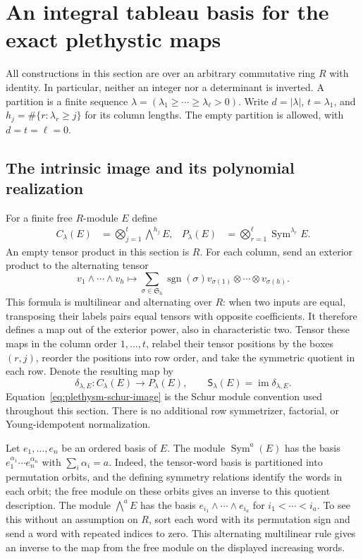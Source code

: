 \section{An integral tableau basis for the exact plethystic maps}
\label{sec:plethysm-integral-tableau-basis}

All constructions in this section are over an arbitrary commutative ring
$R$ with identity. In particular, neither an integer nor a determinant
is inverted. A partition is a finite sequence
$\lambda=(\lambda_1\geq\cdots\geq\lambda_\ell>0)$.
Write $d=|\lambda|$, $t=\lambda_1$, and
$h_j=\#\{r:\lambda_r\geq j\}$ for its column lengths.
The empty partition is allowed, with $d=t=\ell=0$.

\subsection{The intrinsic image and its polynomial realization}

For a finite free $R$-module $E$ define
\begin{align}
 C_\lambda(E)&=\bigotimes_{j=1}^{t}\bigwedge^{h_j}E,
 &P_\lambda(E)&=\bigotimes_{r=1}^{\ell}\operatorname{Sym}^{\lambda_r}E.
 \label{eq:plethysm-column-row-modules}
\end{align}
An empty tensor product in this section is $R$.
For each column, send an exterior product to the alternating tensor
\[
 v_1\wedge\cdots\wedge v_h\longmapsto
 \sum_{\sigma\in\mathfrak S_h}\operatorname{sgn}(\sigma)
 v_{\sigma(1)}\otimes\cdots\otimes v_{\sigma(h)}.
\]
This formula is multilinear and alternating over $R$: when two inputs
are equal, transposing their labels pairs equal tensors with opposite
coefficients. It therefore defines a map out of the exterior power,
also in characteristic two. Tensor these maps in the column order
$1,\ldots,t$, relabel their tensor positions by the boxes $(r,j)$,
reorder the positions into row order, and take the symmetric quotient
in each row. Denote the resulting map by
\begin{equation}
 \delta_{\lambda,E}:C_\lambda(E)\longrightarrow P_\lambda(E),
 \qquad
 \mathsf S_\lambda(E)=\operatorname{im}\delta_{\lambda,E}.
 \label{eq:plethysm-schur-image}
\end{equation}
Equation~\eqref{eq:plethysm-schur-image} is the Schur module convention
used throughout this section. There is no additional row
symmetrizer, factorial, or Young-idempotent normalization.

Let $e_1,\ldots,e_n$ be an ordered basis of $E$.
The module $\operatorname{Sym}^a(E)$ has the basis
$e_1^{\alpha_1}\cdots e_n^{\alpha_n}$ with
$\sum_i\alpha_i=a$. Indeed, the tensor-word basis is partitioned into
permutation orbits, and the defining symmetry relations identify the
words in each orbit; the free module on these orbits gives an inverse
to this quotient description. The module $\bigwedge^a E$ has the basis
$e_{i_1}\wedge\cdots\wedge e_{i_a}$ for
$i_1<\cdots<i_a$. To see this without an assumption on $R$, sort each
word with its permutation sign and send a word with repeated indices
to zero. This alternating multilinear rule gives an inverse to the
map from the free module on the displayed increasing words.

